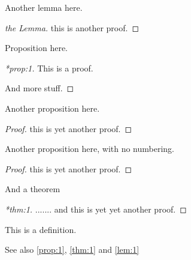 \documentclass[12pt,a5paper]{article}
\begin{document}
\begin{lemma}
\label{lem:1}
Another lemma here.
\end{lemma}
\begin{proof}[the Lemma]
  this is another proof.
\end{proof}

\bigskip

\begin{proposition}
  \label{prop:1}
  Proposition here.
\end{proposition}
\begin{proof}[*prop:1]
  This is a proof.

  And more stuff.
\end{proof}

\bigskip

\begin{proposition}
Another proposition here.
\end{proposition}
\begin{proof}
  this is yet another proof.
\end{proof}

\bigskip

\begin{proposition*}
Another proposition here, with no numbering.
\end{proposition*}
\begin{proof}
  this is yet another proof.
\end{proof}

\bigskip

\begin{theorem}
\label{thm:1}
And a theorem
\end{theorem}
\begin{proof}[*thm:1]
  ....... and  this is yet yet another proof.
\end{proof}

\bigskip

\begin{definition*}
\label{def:1}
This is a definition.
\end{definition*}

\bigskip

See also \autoref{prop:1}, \autoref{thm:1} and \autoref{lem:1}
\end{document}
